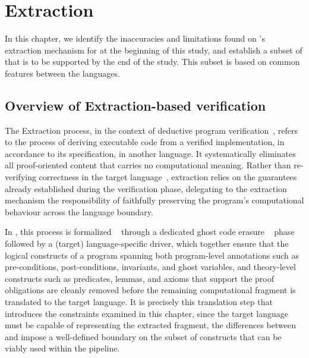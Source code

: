 
%

\chapter{Extraction}
\label{cha:Extraction}

In this chapter, we identify the inaccuracies and limitations found on \whythree's extraction mechanism for \cml at the beginning of
this study, and establish a subset of \whyml that is to be supported by the end of the study. This subset is based on common features
between the languages.

\section{Overview of Extraction-based verification}

The Extraction process, in the context of deductive program verification~\cite{Filliatre11,Hoare69,0207005}, refers to the process of deriving executable code from a verified implementation, in accordance
to its specification, in another language. It systematically eliminates all proof-oriented content that carries no computational meaning. Rather than re-verifying
correctness in the target language~\cite{LeroyCompilerMeaning,MonniauxB22}, extraction relies on the guarantees already established during the verification phase, delegating to the extraction mechanism the
responsibility of faithfully preserving the program's computational behaviour across the language boundary. 

In \whythree, this process is formalized ~\cite{FilliatreP13,boogie11why3} through a dedicated ghost code erasure ~\cite{filliatre:hal-01396864} phase followed by a (target) language-specific driver, which together ensure that the
logical constructs of a \whyml program spanning both program-level annotations such as pre-conditions, post-conditions, invariants, and ghost variables, and theory-level
constructs such as predicates, lemmas, and axioms that support the proof obligations are cleanly removed before the remaining computational fragment is translated to the
target language. It is precisely this translation step that introduces the constraints examined in this chapter, since the target language must be capable of representing
the extracted fragment, the differences between \whyml and \cml impose a well-defined boundary on the subset of \whyml constructs that can be viably used within the pipeline.

